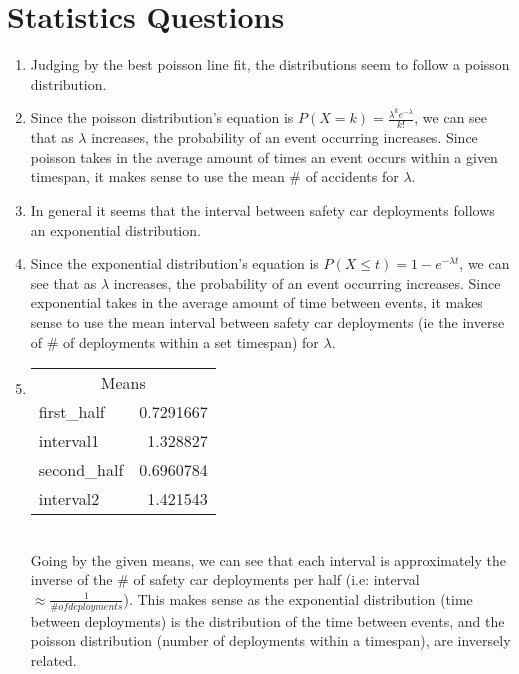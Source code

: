 \documentclass{article}
\begin{document}
\pagebreak

\section*{Statistics Questions}
\begin{enumerate}
    \item Judging by the best poisson line fit, the distributions seem to follow a poisson distribution.
    \item Since the poisson distribution's equation is \(P(X = k) = \frac{\lambda^k e^{-\lambda}}{k!}\), we can see that as \(\lambda\) increases, the probability of an event occurring increases. Since poisson takes in the average amount of times an event occurs within a given timespan, it makes sense to use the mean \# of accidents for \(\lambda\).
    \item In general it seems that the interval between safety car deployments follows an exponential distribution.
    \item Since the exponential distribution's equation is \(P(X \leq t) = 1 - e^{-\lambda t}\), we can see that as \(\lambda\) increases, the probability of an event occurring increases. Since exponential takes in the average amount of time between events, it makes sense to use the mean interval between safety car deployments (ie the inverse of \# of deployments within a set timespan) for \(\lambda\).
    \item
          \setlength{\columnsep}{-5.5cm}
          \begin{multicols}{2}
              \begin{tabular}{lr|}
                  \multicolumn{2}{c}{Means} \\
                  first\_half  & 0.7291667  \\
                  interval1    & 1.328827   \\
                  second\_half & 0.6960784  \\
                  interval2    & 1.421543
              \end{tabular}
              \\
              Going by the given means, we can see that each interval is approximately the inverse of the \# of safety car deployments per half (i.e: interval \(\approx \frac{1}{\# of deployments}\)). This makes sense as the exponential distribution (time between deployments) is the distribution of the time between events, and the poisson distribution (number of deployments within a timespan), are inversely related.
          \end{multicols}


\end{enumerate}
\end{document}
